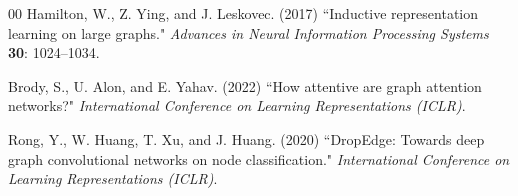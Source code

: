\documentclass[3p,times,procedia]{elsarticle}
\begin{document}
\begin{thebibliography}{00}
Hamilton, W., Z. Ying, and J. Leskovec. (2017) ``Inductive
representation learning on large graphs." {\it Advances in Neural
Information Processing Systems} {\bf 30}: 1024--1034.

Brody, S., U. Alon, and E. Yahav. (2022) ``How attentive are
graph attention networks?" {\it International Conference on Learning
Representations (ICLR)}.

Rong, Y., W. Huang, T. Xu, and J. Huang. (2020)
``DropEdge: Towards deep graph convolutional networks on node
classification." {\it International Conference on Learning
Representations (ICLR)}.

\end{thebibliography}
\end{document}
